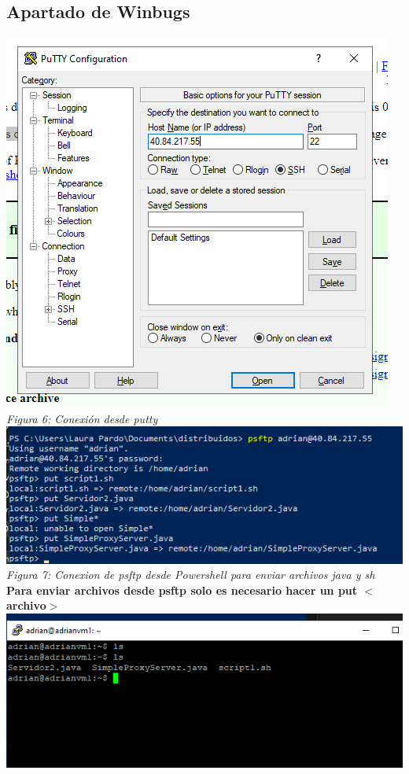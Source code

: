 \documentclass[10pt,executivepaper]{article}
\begin{document}
\subsection{Apartado de Winbugs}
\begin{center}
  \includegraphics[scale=0.65]{imgs/putty.png}\\
  \textit{Figura 6: Conexión desde putty}\\
  \includegraphics[scale=0.65]{imgs/conexion_psftp.png}\\
  \textit{Figura 7: Conexion de psftp desde Powershell para enviar archivos java y sh}\\
  \textbf{Para enviar archivos desde psftp solo es necesario hacer un put $<$archivo$>$}\\
  \includegraphics[scale=0.65]{imgs/envio_de_archivos.png}\\

\end{center}
\end{document}
